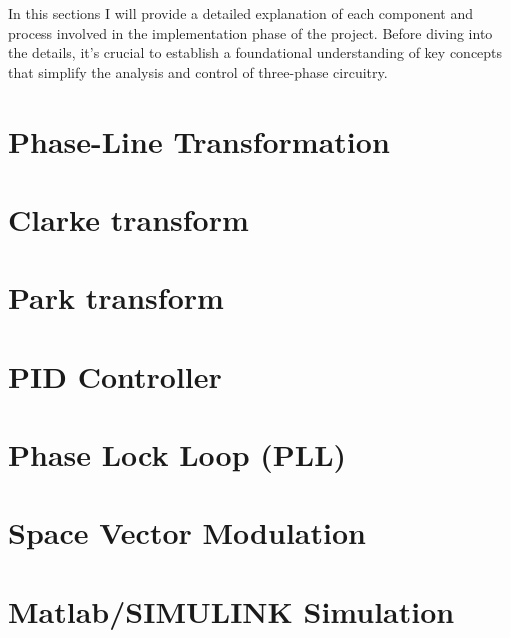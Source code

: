 In this sections I will provide a detailed explanation of each component and
process involved in the implementation phase of the project. Before diving into
the details, it's crucial to establish a foundational understanding of key
concepts that simplify the analysis and control of three-phase circuitry.

\section{Phase-Line Transformation}

\section{Clarke transform}

\section{Park transform}

\section{PID Controller}

\section{Phase Lock Loop (PLL)}

\section{Space Vector Modulation}

\section{Matlab/SIMULINK Simulation}

